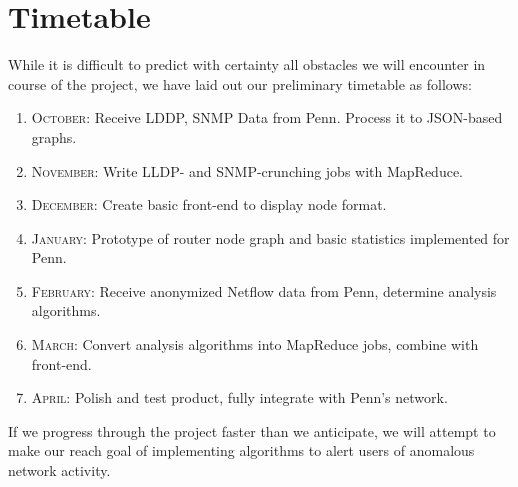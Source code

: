 \documentclass{sig-alternate}
\begin{document}
\section{Timetable}

While it is difficult to predict with certainty all obstacles we will encounter
in course of the project, we have laid out our preliminary timetable as follows:

\begin{enumerate}
    \item \textsc{October}: Receive LDDP, SNMP Data from Penn. Process it to
        JSON-based graphs.
    \item \textsc{November}: Write LLDP- and SNMP-crunching jobs with MapReduce.
    \item \textsc{December}: Create basic front-end to display node format.
    \item \textsc{January}: Prototype of router node graph and basic statistics
        implemented for Penn.
    \item \textsc{February}: Receive anonymized Netflow data from Penn,
        determine analysis algorithms.
    \item \textsc{March}: Convert analysis algorithms into MapReduce jobs,
        combine with front-end.
    \item \textsc{April}: Polish and test product, fully integrate with Penn's
        network.
\end{enumerate}

If we progress through the project faster than we anticipate, we will attempt to
make our reach goal of implementing algorithms to alert users of anomalous
network activity.




\nocite{*}
\end{document}
